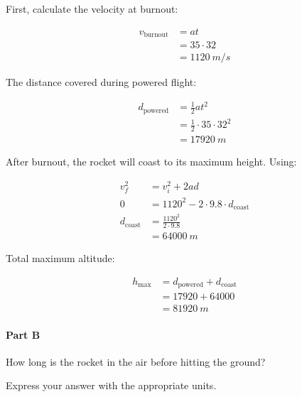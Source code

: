 \begin{solution}
	First, calculate the velocity at burnout:

	\begin{align*}
		v_{\mathrm{burnout}} &= a t \\
		&= 35 \cdot 32 \\
		&= \SI{1120}{m/s}
	\end{align*}

	The distance covered during powered flight:

	\begin{align*}
		d_{\mathrm{powered}} &= \frac{1}{2} a t^2 \\
		&= \frac{1}{2} \cdot 35 \cdot 32^2 \\
		&= \SI{17920}{m}
	\end{align*}

	After burnout, the rocket will coast to its maximum height. Using:

	\begin{align*}
		v_f^2 &= v_i^2 + 2 a d \\
		0 &= 1120^2 - 2 \cdot 9.8 \cdot d_{\mathrm{coast}} \\
		d_{\mathrm{coast}} &= \frac{1120^2}{2 \cdot 9.8} \\
		&= \SI{64000}{m}
	\end{align*}

	Total maximum altitude:

	\begin{align*}
		h_{\mathrm{max}} &= d_{\mathrm{powered}} + d_{\mathrm{coast}} \\
		&= 17920 + 64000 \\
		&= \boxed{\SI{81920}{m}}
	\end{align*}
\end{solution}

\paragraph{Part B}
How long is the rocket in the air before hitting the ground?

Express your answer with the appropriate units.


